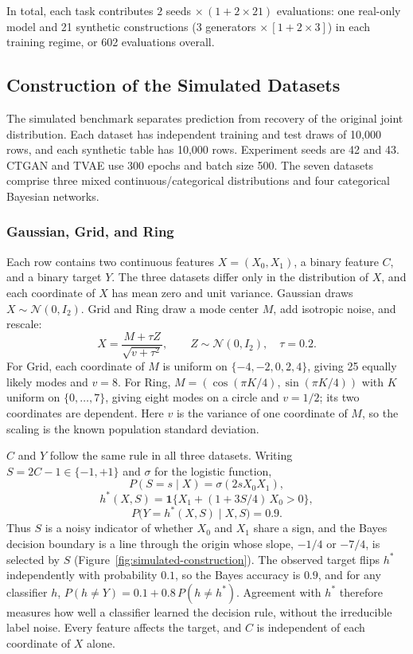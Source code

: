\documentclass[letterpaper]{article}
\begin{document}
In total, each task contributes $2$ seeds $\times\,(1 + 2\times 21)$
evaluations: one real-only model and 21 synthetic constructions
($3$ generators $\times\,[1 + 2\times 3]$) in each training regime, or
602 evaluations overall.

\subsection{Construction of the Simulated Datasets}
The simulated benchmark separates prediction from recovery of
the original joint distribution. Each dataset has independent training
and test draws of 10,000 rows, and each synthetic table has 10,000 rows.
Experiment seeds are 42 and 43. CTGAN and TVAE use 300 epochs and batch
size 500. The seven datasets comprise three mixed continuous/categorical
distributions and four categorical Bayesian networks.

\subsubsection{Gaussian, Grid, and Ring}
Each row contains two continuous features $X=(X_0,X_1)$, a binary feature
$C$, and a binary target $Y$. The three datasets differ only in the
distribution of $X$, and each coordinate of $X$ has mean zero and unit
variance. Gaussian draws $X\sim\mathcal N(0,I_2)$. Grid and Ring draw a mode
center $M$, add isotropic noise, and rescale:
\begin{equation}
 X=\frac{M+\tau Z}{\sqrt{v+\tau^2}},\qquad Z\sim\mathcal N(0,I_2),\quad \tau=0.2.
\end{equation}
For Grid, each coordinate of $M$ is uniform on $\{-4,-2,0,2,4\}$, giving 25
equally likely modes and $v=8$. For Ring,
$M=(\cos(\pi K/4),\sin(\pi K/4))$ with $K$ uniform on
$\{0,\dots,7\}$, giving eight modes on a circle and $v=1/2$; its two
coordinates are dependent. Here $v$ is the variance of one coordinate of
$M$, so the scaling is the known population standard deviation.

$C$ and $Y$ follow the same rule in all three datasets. Writing
$S=2C-1\in\{-1,+1\}$ and $\sigma$ for the logistic function,
\begin{equation}
 P(S=s\mid X)=\sigma(2sX_0X_1),
\end{equation}
\begin{equation}
 h^*(X,S)=\mathbf 1\{X_1+(1+3S/4)\,X_0>0\},
\end{equation}
\begin{equation}
 P\big(Y=h^*(X,S)\mid X,S\big)=0.9 .
\end{equation}
Thus $S$ is a noisy indicator of whether $X_0$ and $X_1$ share a sign, and
the Bayes decision boundary is a line through the origin whose slope,
$-1/4$ or $-7/4$, is selected by $S$ (Figure~\ref{fig:simulated-construction}).
The observed target flips $h^*$ independently with probability $0.1$, so
the Bayes accuracy is $0.9$, and for any classifier $h$,
$P(h\neq Y)=0.1+0.8\,P(h\neq h^*)$. Agreement with $h^*$ therefore measures
how well a classifier learned the decision rule, without the irreducible
label noise. Every feature affects the target, and $C$ is independent of each
coordinate of $X$ alone.
\end{document}
